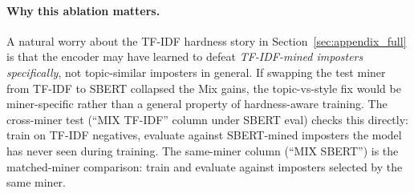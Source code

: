 \documentclass[11pt]{article}
\begin{document}
\paragraph{Why this ablation matters.} A natural worry about the TF-IDF hardness story in Section~\ref{sec:appendix_full} is that the encoder may have learned to defeat \emph{TF-IDF-mined imposters specifically}, not topic-similar imposters in general. If swapping the test miner from TF-IDF to SBERT collapsed the Mix gains, the topic-vs-style fix would be miner-specific rather than a general property of hardness-aware training. The cross-miner test (``MIX TF-IDF'' column under SBERT eval) checks this directly: train on TF-IDF negatives, evaluate against SBERT-mined imposters the model has never seen during training. The same-miner column (``MIX SBERT'') is the matched-miner comparison: train and evaluate against imposters selected by the same miner.
\end{document}
